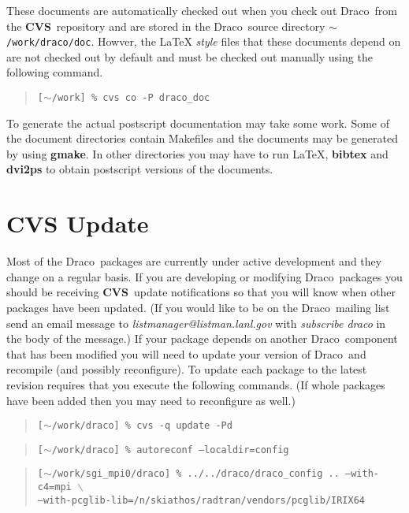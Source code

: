 \documentclass[10pt]{nmemo}
\newcommand{\comp}[1]{\normalfont\normalsize\texttt{#1}}
\newcommand{\draco}{{\normalfont\sffamily Draco}}
\newcommand{\cvs}{{\normalfont\bfseries CVS}}
\begin{document}
These documents are automatically checked out when you check out
\draco\ from the \cvs\ repository and are stored in the \draco\ source
directory \comp{$\sim$/work/draco/doc}.  Howver, the \LaTeX
\emph{style} files that these documents depend on are not checked out
by default and must be checked out manually using the following
command.

\footnotesize
\begin{quote}
\texttt{[$\sim$/work] \% cvs co -P draco\_doc}
\end{quote}
\normalsize

To generate the actual postscript documentation may take some work.
Some of the document directories contain Makefiles and the documents
may be generated by using \textbf{gmake}.  In other directories you
may have to run \LaTeX, \textbf{bibtex} and \textbf{dvi2ps} to obtain
postscript versions of the documents.

\section{CVS Update}

Most of the \draco\ packages are currently under active development
and they change on a regular basis.  If you are developing or
modifying \draco\ packages you should be receiving \cvs\ update
notifications so that you will know when other packages have been
updated.  (If you would like to be on the \draco\ mailing list send an
email message to \emph{listmanager@listman.lanl.gov} with
\emph{subscribe draco} in the body of the message.)  If your package
depends on another \draco\ component that has been modified you will
need to update your version of \draco\ and recompile (and possibly
reconfigure).  To update each package to the latest revision requires
that you execute the following commands.  (If whole packages have been
added then you may need to reconfigure as well.)

\footnotesize
\begin{verse}
\texttt{[$\sim$/work/draco] \% cvs -q update -Pd}
\end{verse}

\begin{verse}
\texttt{[$\sim$/work/draco] \% autoreconf --localdir=config }
\end{verse}

\begin{verse}
\texttt{[$\sim$/work/sgi\_mpi0/draco] \% ../../draco/draco\_config
.. --with-c4=mpi $\backslash$ \\
\hspace{0.5in}--with-pcglib-lib=/n/skiathos/radtran/vendors/pcglib/IRIX64}
\end{verse}
\end{document}
